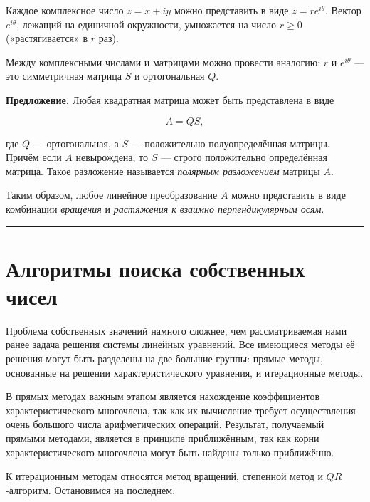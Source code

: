 \documentclass[11pt,a4paper]{article}
\renewcommand{\linethickness}{0.1ex}
\begin{document}
Каждое комплексное число \(z = x + iy\) можно представить в виде
\(z = r e^{i\theta}\). Вектор \(e^{i\theta}\), лежащий на единичной
окружности, умножается на число \(r \ge 0\) («растягивается» в \(r\)
раз).

Между комплексными числами и матрицами можно провести аналогию: \(r\) и
\(e^{i\theta}\) --- это симметричная матрица \(S\) и ортогональная
\(Q\).

\textbf{Предложение.} Любая квадратная матрица может быть представлена в
виде

\[ A = QS, \]

где \(Q\) --- ортогональная, а \(S\) --- положительно полуопределённая
матрицы. Причём если \(A\) невырождена, то \(S\) --- строго положительно
определённая матрица. Такое разложение называется \emph{полярным
разложением} матрицы \(A\).

Таким образом, любое линейное преобразование \(A\) можно представить в
виде комбинации \emph{вращения} и \emph{растяжения к взаимно
перпендикулярным осям}.

    \begin{center}\rule{0.5\linewidth}{\linethickness}\end{center}

    \hypertarget{ux430ux43bux433ux43eux440ux438ux442ux43cux44b-ux43fux43eux438ux441ux43aux430-ux441ux43eux431ux441ux442ux432ux435ux43dux43dux44bux445-ux447ux438ux441ux435ux43b}{%
\section{Алгоритмы поиска собственных
чисел}\label{ux430ux43bux433ux43eux440ux438ux442ux43cux44b-ux43fux43eux438ux441ux43aux430-ux441ux43eux431ux441ux442ux432ux435ux43dux43dux44bux445-ux447ux438ux441ux435ux43b}}

Проблема собственных значений намного сложнее, чем рассматриваемая нами
ранее задача решения системы линейных уравнений. Все имеющиеся методы её
решения могут быть разделены на две большие группы: прямые методы,
основанные на решении характеристического уравнения, и итерационные
методы.

В прямых методах важным этапом является нахождение коэффициентов
характеристического многочлена, так как их вычисление требует
осуществления очень большого числа арифметических операций. Результат,
получаемый прямыми методами, является в принципе приближённым, так как
корни характеристического многочлена могут быть найдены только
приближённо.

К итерационным методам относятся метод вращений, степенной метод и
\(QR\)-алгоритм. Остановимся на последнем.
\end{document}
